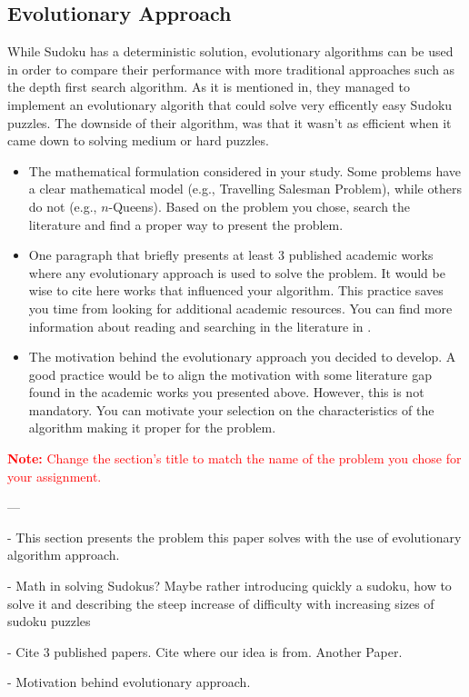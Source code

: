\subsection{Evolutionary Approach}
{While Sudoku has a deterministic solution, evolutionary algorithms can be used in order to compare their performance with more traditional approaches such as the depth first search algorithm. As it is mentioned in\cite{Moraglio}, they managed to implement an evolutionary algorith that could solve very efficently easy Sudoku puzzles. The downside of their algorithm, was that it wasn't as efficient when it came down to solving medium or hard puzzles.   }
{\color{red}
\begin{itemize}
    \item The mathematical formulation considered in your study. Some problems have a clear mathematical model (e.g., Travelling Salesman Problem), while others do not (e.g., $n$-Queens). Based on the problem you chose, search the literature and find a proper way to present the problem.
    \item One paragraph that briefly presents at least 3 published academic works where any evolutionary approach is used to solve the problem. It would be wise to cite here works that influenced your algorithm. This practice saves you time from looking for additional academic resources. You can find more information about reading and searching in the literature in \cite{zobel2014reading}.
    \item The motivation behind the evolutionary approach you decided to develop. A good practice would be to align the motivation with some literature gap found in the academic works you presented above. However, this is not mandatory. You can motivate your selection on the characteristics of the algorithm making it proper for the problem.
\end{itemize}
}

\textcolor{red}{\textbf{Note:} Change the section's title to match the name of the problem you chose for your assignment.}

---

- This section presents the problem this paper solves with the use of evolutionary algorithm approach. 

- Math in solving Sudokus? Maybe rather introducing quickly a sudoku, how to solve it and describing the steep increase of difficulty with increasing sizes of sudoku puzzles

- Cite 3 published papers. Cite where our idea is from\cite{Mantere2007}. Another Paper\cite{Amil2019}.

- Motivation behind evolutionary approach.


